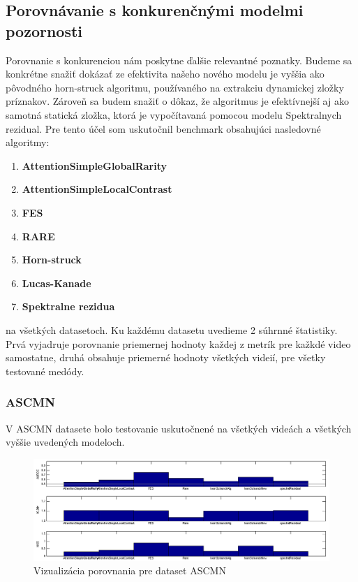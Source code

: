 \subsection{Porovnávanie s konkurenčnými modelmi pozornosti}
Porovnanie s konkurenciou nám poskytne ďalšie relevantné poznatky.
Budeme sa konkrétne snažiť dokázať ze efektivita našeho nového modelu je vyššia ako pôvodného horn-struck algoritmu\cite{horn-schunck}, používaného na extrakciu dynamickej zložky príznakov.
Zároveň sa budem snažiť o dôkaz, že algoritmus je efektívnejší aj ako samotná statická zložka, ktorá je vypočítavaná pomocou modelu Spektralnych rezidual\cite{spectral-rezidual}.
Pre tento účel som uskutočnil benchmark obsahujúci nasledovné algoritmy:
\begin{enumerate}
  \item\textbf{AttentionSimpleGlobalRarity\cite{global-rarity}}
  \item\textbf{AttentionSimpleLocalContrast\cite{global-rarity}}
  \item\textbf{FES\cite{fes}}
  \item\textbf{RARE\cite{rare-1}}
  \item\textbf{Horn-struck\cite{horn-schunck}}
  \item\textbf{Lucas-Kanade\cite{lucas-kanade}}
  \item\textbf{Spektralne rezidua\cite{spectral-rezidual}}
\end{enumerate}
na všetkých datasetoch.
Ku každému datasetu uvedieme 2 súhrnné štatistiky.
Prvá vyjadruje porovnanie priemernej hodnoty každej z metrík pre kažkdé video samostatne, druhá obsahuje priemerné hodnoty všetkých videií, pre všetky testované medódy.

\subsubsection{ASCMN}
V ASCMN datasete bolo testovanie uskutočnené na všetkých videách a všetkých vyššie uvedených modeloch.

\begin{figure}[H]
  \includegraphics[width=15cm]{pics/porovnanie-accv-global-new.png}
  \caption{Vizualizácia porovnania pre dataset ASCMN\cite{accv}}
\end{figure}

